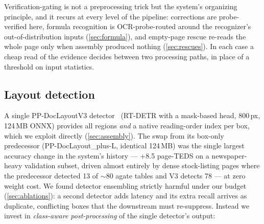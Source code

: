 Verification-gating is not a preprocessing trick but the system's organizing principle, and it recurs at every level of the pipeline: corrections are probe-verified here, formula recognition is OCR-probe-routed around the recognizer's out-of-distribution inputs (\cref{sec:formula}), and empty-page rescue re-reads the whole page only when assembly produced nothing (\cref{sec:rescues}). In each case a cheap read of the evidence decides between two processing paths, in place of a threshold on input statistics.

\subsection{Layout detection}
\label{sec:layout}

A single PP-DocLayoutV3 detector~\cite{paddleocrvl} (RT-DETR with a mask-based head, 800\,px, 124\,MB ONNX) provides all regions \emph{and} a native reading-order index per box, which we exploit directly (\cref{sec:assembly}). The swap from its box-only predecessor (PP-DocLayout\_plus-L, identical 124\,MB) was the single largest accuracy change in the system's history --- +8.5 page-TEDS on a newspaper-heavy validation subset, driven almost entirely by dense stock-listing pages where the predecessor detected 13 of $\sim$80 agate tables and V3 detects 78 --- at zero weight cost. We found detector ensembling strictly harmful under our budget (\cref{sec:ablations}): a second detector adds latency and its extra recall arrives as duplicate, conflicting boxes that the downstream must re-suppress. Instead we invest in \emph{class-aware post-processing} of the single detector's output:

